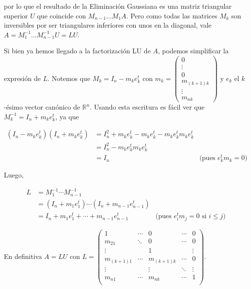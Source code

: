 por lo que el resultado de la Eliminación Gaussiana es una matriz triangular superior $U$ que coincide con $M_{n-1} \ldots M_1 A$. Pero como todas las matrices $M_k$ son inversibles por ser triangulares inferiores con unos en la diagonal, vale $A = M_1^{-1}\ldots M_{n - 1}^{-1} U = LU$.
 
Si bien ya hemos llegado a la factorización LU de $A$, podemos simplificar la expresión de $L$. Notemos que $M_k = I_n - m_k e_k^t$ con $m_k = \begin{pmatrix}0\\ \vdots \\ 0 \\ m_{(k+1)k} \\ \vdots \\ m_{nk}\end{pmatrix}$ y $e_k$ el $k$-ésimo vector canónico de $\mathbb{R}^n$. Usando esta escritura es fácil ver que $M_k^{-1} = I_n + m_k e_k^t$, ya que

\begin{align*}
(I_n - m_k e_k^t)(I_n + m_k e_k^t) & = I_n^2 + m_k e_k^t - m_k e_k^t - m_k e_k^t m_k e_k^t &\\
& = I_n^2 - m_k e_k^t m_k e_k^t &\\
& = I_n & \text{(pues } e_k^t m_k = 0\text{)}
\end{align*}

Luego,

\begin{align*}
L & = M_1^{-1} \cdots M_{n - 1}^{-1} &\\
    & = (I_n + m_1 e_1^t) \cdots (I_n + m_{n - 1} e_{n - 1}^t) &\\
    & = I_n + m_1 e_1^t + \cdots + m_{n - 1} e_{n - 1}^t & \text{(pues } e_i^t m_j = 0 \text{ si } i \leq j \text{)}
\end{align*}

En definitiva $A = LU$ con $L = \begin{pmatrix} 
1           & \cdots    & 0                 & \cdots    & 0 \\
m_{21}      & \ddots    & 0                 & \cdots    & 0 \\
\vdots      &           & 1                 &           & \vdots\\
m_{(k+1)1}  & \cdots        & m_{(k+1)k}    & \cdots        & 0\\
\vdots      &           & \vdots            & \ddots        & \vdots\\
m_{n1}      & \cdots        & m_{nk}        & \cdots        & 1\\
\end{pmatrix}$.


